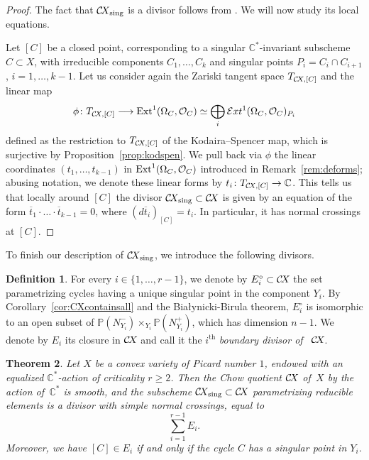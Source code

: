 \documentclass[10pt,a4paper]{article}
\numberwithin{equation}{section}
\newtheorem{theorem}{Theorem}[section]
\theoremstyle{definition}
\newtheorem{definition}[theorem]{Definition}
\theoremstyle{remark}
\def\sing{\operatorname{sing}}
\def\C{{\mathbb C}}
\def\P{{\mathbb P}}
\def\cO{{\mathcal{O}}}
\def\cExt{{\mathcal E}xt}
\def\operatorname#1{\mathop{\rm #1}\nolimits}
\def\Ext{\operatorname{Ext}}
\def\CX{\mathcal{C}\!X\hspace{-0.5pt}}
\def\ol{\overline}
\newcommand\lra{\longrightarrow}
\newcommand{\supth}[1]{\ensuremath{#1^{\mathrm{th}}}}
\begin{document}
\begin{proof}
The fact that $\CX_{\sing}$ is a divisor follows from \cite[Propositions 6.2.11 and 6.3.5]{Talpo}.  We will now study its local equations.

Let $[C]$ be a closed point, corresponding to a singular $\C^*$-invariant subscheme $C\subset X$, with irreducible components $C_1,\dots, C_k$ and singular points $P_i=C_i\cap C_{i+1}$, $i=1,\dots,k-1$. Let us  consider again the Zariski tangent space $T_{\CX,[C]}$ and the linear map
$$
\phi\colon T_{\CX,[C]}\lra \Ext^1(\Omega_C,\cO_C)\simeq \bigoplus_i\cExt^1(\Omega_C,\cO_C)_{P_i}
$$ 
defined as the restriction to $T_{\CX,[C]}$ of the Kodaira--Spencer map, which is surjective by Proposition~\ref{prop:kodspen}. We pull back via $\phi$ the linear coordinates $(t_1,\dots, t_{k-1})$ in  $\Ext^1(\Omega_C,\cO_C)$ introduced in Remark~\ref{rem:deforms}; abusing notation, we denote these linear forms by $t_i\colon T_{\CX,[C]}\to\C$.  This tells us that locally around $[C]$ the divisor $\CX_{\sing}\subset\CX$ is given by an equation of the form $\ol{t}_1\cdot\ldots \cdot \ol{t}_{k-1}=0$, where $(d\ol{t}_i)_{[C]}=t_i$.  In particular, it has normal crossings at $[C]$. 
\end{proof}

To finish our description of $\CX_{\sing}$,  we introduce the following divisors.  

\begin{definition}\label{def:Ei}
For  every $i\in \{1,\dots,r-1\}$, we denote by $E^\circ_i\subset\CX$ the set parametrizing cycles having a unique singular point in the component $Y_i$. By Corollary~\ref{cor:CXcontainsall} and the Bia{\l}ynicki-Birula theorem, $E^\circ_i$ is isomorphic to an open subset of $\P(N_{Y_i}^-)\times_{Y_i}\P(N_{Y_i}^+)$, which has dimension $n-1$. We denote by $E_i$ its closure in $\CX$ and call it the $\supth{i}$ {\em boundary divisor of }\, $\CX$. 
\end{definition}



\begin{theorem}\label{thm:smoothborder} 
Let $X$ be a convex variety of Picard number $1$, endowed with an equalized $\C^*$-action of criticality $r\geq 2$. Then the Chow quotient $\CX$ of\, $X$ by the action of\, $\C^*$ is smooth, and the subscheme $\CX_{\sing}\subset\CX$ parametrizing reducible elements is a divisor with simple normal crossings, equal to
$$\sum_{i=1}^{r-1}E_i.$$
Moreover, we have $[C] \in E_i$ if and only if the cycle $C$ has a singular point in $Y_i$. 
\end{theorem}
\end{document}

